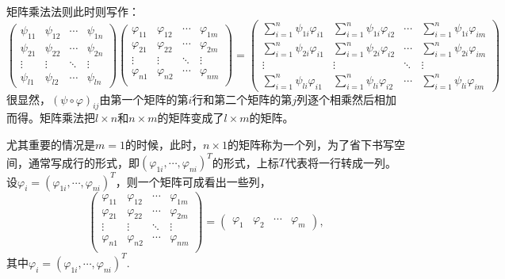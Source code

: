 \para 矩阵乘法法则此时则写作：
\begin{equation}
\begin{pmatrix}
	\psi_{11} & \psi_{12} & \cdots & \psi_{1n}\\
	\psi_{21} & \psi_{22} & \cdots & \psi_{2n}\\
	\vdots & \vdots & \ddots & \vdots \\
	\psi_{l1} & \psi_{l2} & \cdots & \psi_{ln}
\end{pmatrix}
\begin{pmatrix}
	\varphi_{11} & \varphi_{12} & \cdots & \varphi_{1m}\\
	\varphi_{21} & \varphi_{22} & \cdots & \varphi_{2m}\\
	\vdots & \vdots & \ddots & \vdots \\
	\varphi_{n1} & \varphi_{n2} & \cdots & \varphi_{nm}\\
\end{pmatrix}
=
\begin{pmatrix}
	\sum_{i=1}^n \psi_{1i}\varphi_{i1} & \sum_{i=1}^n \psi_{1i}\varphi_{i2} & \cdots & \sum_{i=1}^n \psi_{1i}\varphi_{im}\\
	\sum_{i=1}^n \psi_{2i}\varphi_{i1} & \sum_{i=1}^n \psi_{2i}\varphi_{i2}& \cdots & \sum_{i=1}^n \psi_{2i}\varphi_{im}\\
	\vdots & \vdots & \ddots & \vdots \\
	\sum_{i=1}^n \psi_{li}\varphi_{i1} & \sum_{i=1}^n \psi_{li}\varphi_{i2}& \cdots & \sum_{i=1}^n \psi_{li}\varphi_{im}
\end{pmatrix}
\end{equation}
很显然，$(\psi\circ\varphi)_{ij}$由第一个矩阵的第$i$行和第二个矩阵的第$j$列逐个相乘然后相加而得。矩阵乘法把$l\times n$和$n \times m$的矩阵变成了$l \times m$的矩阵。

尤其重要的情况是$m=1$的时候，此时，$n\times 1$的矩阵称为一个列，为了省下书写空间，通常写成行的形式，即$(\varphi_{1i},\cdots,\varphi_{ni})^T$的形式，上标$T$代表将一行转成一列。设$\varphi_{i}=(\varphi_{1i},\cdots,\varphi_{ni})^T$，则一个矩阵可成看出一些列，
\[
	\begin{pmatrix}
	\varphi_{11} & \varphi_{12} & \cdots & \varphi_{1m}\\
	\varphi_{21} & \varphi_{22} & \cdots & \varphi_{2m}\\
	\vdots & \vdots & \ddots & \vdots \\
	\varphi_{n1} & \varphi_{n2} & \cdots & \varphi_{nm}\\
	\end{pmatrix}
	=
	\begin{pmatrix}
	\varphi_{1} & \varphi_{2} & \cdots & \varphi_{m}
	\end{pmatrix},
\]
其中$\varphi_i=(\varphi_{1i},\cdots,\varphi_{ni})^T$. 

